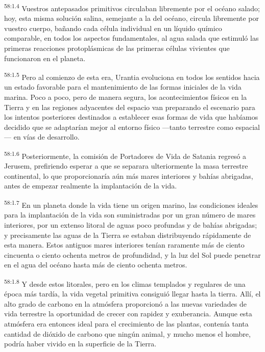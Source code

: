 \par
\textsuperscript{58:1.4} Vuestros antepasados primitivos circulaban libremente por el océano salado; hoy, esta misma solución salina, semejante a la del océano, circula libremente por vuestro cuerpo, bañando cada célula individual en un líquido químico comparable, en todos los aspectos fundamentales, al agua salada que estimuló las primeras reacciones protoplásmicas de las primeras células vivientes que funcionaron en el planeta.

\par
\textsuperscript{58:1.5} Pero al comienzo de esta era, Urantia evoluciona en todos los sentidos hacia un estado favorable para el mantenimiento de las formas iniciales de la vida marina. Poco a poco, pero de manera segura, los acontecimientos físicos en la Tierra y en las regiones adyacentes del espacio van preparando el escenario para los intentos posteriores destinados a establecer esas formas de vida que habíamos decidido que se adaptarían mejor al entorno físico ---tanto terrestre como espacial--- en vías de desarrollo.

\par
\textsuperscript{58:1.6} Posteriormente, la comisión de Portadores de Vida de Satania regresó a Jerusem, prefiriendo esperar a que se separara ulteriormente la masa terrestre continental, lo que proporcionaría aún más mares interiores y bahías abrigadas, antes de empezar realmente la implantación de la vida.

\par
\textsuperscript{58:1.7} En un planeta donde la vida tiene un origen marino, las condiciones ideales para la implantación de la vida son suministradas por un gran número de mares interiores, por un extenso litoral de aguas poco profundas y de bahías abrigadas; y precisamente las aguas de la Tierra se estaban distribuyendo rápidamente de esta manera. Estos antiguos mares interiores tenían raramente más de ciento cincuenta o ciento ochenta metros de profundidad, y la luz del Sol puede penetrar en el agua del océano hasta más de ciento ochenta metros.

\par
\textsuperscript{58:1.8} Y desde estos litorales, pero en los climas templados y regulares de una época más tardía, la vida vegetal primitiva consiguió llegar hasta la tierra. Allí, el alto grado de carbono en la atmósfera proporcionó a las nuevas variedades de vida terrestre la oportunidad de crecer con rapidez y exuberancia. Aunque esta atmósfera era entonces ideal para el crecimiento de las plantas, contenía tanta cantidad de dióxido de carbono que ningún animal, y mucho menos el hombre, podría haber vivido en la superficie de la Tierra.

